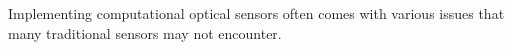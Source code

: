 Implementing computational optical sensors often comes with various issues that many traditional sensors may not encounter.

	

